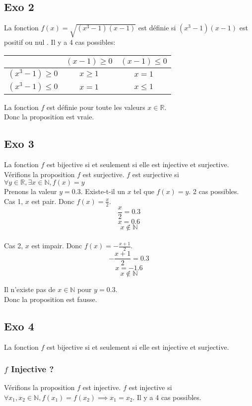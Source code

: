 \documentclass[]{book}
\theoremstyle{definition}
\begin{document}
\subsection*{Exo 2}
La fonction $f(x) = \sqrt{(x^3-1)(x-1)}$ est d\'efinie si $(x^3-1)(x-1)$ est positif ou nul . Il y a 4 cas possibles:
\begin{center}
\begin{tabular}{c|c|c} 
     & $(x-1) \geq 0$ & $(x-1) \leq 0$ \\
      \hline
     $(x^3-1) \geq 0$  & $x \geq 1$ & $x =1$\\
      \hline
     $(x^3-1) \leq 0$ & $x =1$ & $x \leq 1$\\
\end{tabular}
\end{center}


La fonction $f$ est d\'efinie pour toute les valeurs $x \in \mathbb{R}$.
\\ 
Donc la proposition est vraie.


\subsection*{Exo 3}
La fonction $f$ est bijective si et seulement si elle est injective et surjective.
\\
V\'erifions la proposition $f$ est surjective.
$f$ est surjective si $\forall y \in \mathbb{R}, \exists x \in \mathbb{N}, f(x) = y$
\\
Prenons la valeur $y = 0.3$. Existe-t-il un $x$ tel que $f(x) = y$. 2 cas possibles.
\\
Cas 1, $x$ est pair. Donc $f(x) = \frac{x}{2}$.
$$\frac{x}{2} = 0.3$$
$$x = 0.6$$
$$x \notin \mathbb{N}$$
\\
Cas 2, $x$ est impair. Donc $f(x) = -\frac{x+1}{2}$.
$$-\frac{x+1}{2} = 0.3$$
$$x = -1.6$$
$$x \notin \mathbb{N}$$

Il n'existe pas de $x \in \mathbb{N}$ pour $y=0.3$.
\\ 
Donc la proposition est fausse.

\subsection*{Exo 4}
La fonction $f$ est bijective si et seulement si elle est injective et surjective.
\subsubsection*{$f$ Injective ?}
V\'erifions la proposition $f$ est injective.
$f$ est injective si $\forall x_1, x_2 \in \mathbb{N}, f(x_1) = f(x_2) \implies x_1 = x_2$. Il y a 4 cas possibles.
\end{document}
